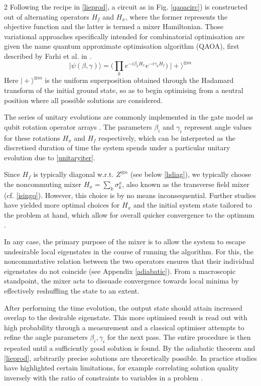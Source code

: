 \documentclass [10pt]{article}
\newcommand {\qvec}[1] {\vert #1 \rangle}
\begin{document}
\begin {multicols}{2}
Following the recipe in \eqref{lieprod}, a circuit as in Fig.
\ref{qaoacirc}) is constructed out of alternating operators $H_f$ and $H_x$,
where the former represents the objective function and the latter is termed
a mixer Hamiltonian. Those variational approaches specifically intended for
combinatorial optimisation are given the name quantum approximate optimisation
algorithm (QAOA), first described by Farhi et al. in \cite{qaoaintro}.
\begin {equation}
\label {qaoa}
\qvec{\psi(\beta, \gamma)} =
\big( \prod_k e^{-i \beta_k H_x} e^{-i \gamma_k H_f} \big)
\; \qvec{+}^{\otimes m}
\end {equation}
Here $\qvec{+}^{\otimes m}$ is the uniform superposition obtained through
the Hadamard transform of the initial ground state, so as to begin optimising
from a neutral position where all possible solutions are considered.

The series of unitary evolutions are commonly implemented in the gate model as
qubit rotation operator arrays \cite{effvrp}. The parameters $\beta_i$ and
$\gamma_i$ represent angle values for these rotations $H_x$ and $H_f$
respectively, which can be interpreted as the discretised duration of time the
system spends under a particular unitary evolution due to \eqref{unitaryiter}.

Since $H_f$ is typically diagonal w.r.t. $Z^{\otimes n}$ (see below
\eqref{hdiag}), we typically choose the noncommuting mixer
$H_x = \sum_k \sigma^x_k$, also known as the transverse field mixer
(cf. \eqref{isingq}). However, this choice is by
no means inconsequential. Further studies have yielded more optimal choices for
$H_x$ and the initial system state tailored to the problem at hand, which allow
for overall quicker convergence to the optimum \cite{mixeropt}.

In any case, the primary purpose of the mixer is to allow the system to
escape undesirable local eigenstates in the course of running the algorithm.
For this, the noncommutative relation between the two operators ensures that
their individual eigenstates do not coincide (see Appendix \ref{adiabatic}).
From a macroscopic standpoint, the mixer acts to dissuade convergence towards
local minima by effectively reshuffling the state to an extent.

After performing the time evolution, the output state should attain increased
overlap to the desirable eigenstate. This more optimised result is read out with
high probability through a measurement and a classical optimiser attempts to
refine the angle parameters $\beta_i, \gamma_i$ for the next pass. The entire
procedure is then repeated until a sufficiently good solution is found. By the
adiabatic theorem and \eqref{lieprod}, arbitrarily precise solutions are
theoretically possible. In practice studies have highlighted certain limitations,
for example correlating solution quality inversely with the ratio of constraints
to variables in a problem \cite{qaoadensitybound}.



\end{multicols}
\end{document}
